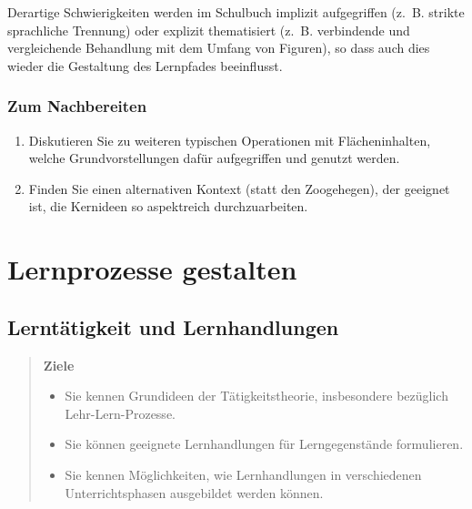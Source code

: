 \documentclass[
]{scrbook}
\providecommand{\tightlist}{%
  \setlength{\itemsep}{0pt}\setlength{\parskip}{0pt}}
\theoremstyle{definition}
\theoremstyle{definition}
\theoremstyle{definition}
\theoremstyle{definition}
\theoremstyle{remark}
\begin{document}
Derartige Schwierigkeiten werden im Schulbuch implizit aufgegriffen (z.~B. strikte sprachliche Trennung) oder explizit thematisiert (z.~B. verbindende und vergleichende Behandlung mit dem Umfang von Figuren), so dass auch dies wieder die Gestaltung des Lernpfades beeinflusst.

\hypertarget{erstesintermezzo-nachbereitung}{%
\section{Zum Nachbereiten}\label{erstesintermezzo-nachbereitung}}

\begin{enumerate}
\def\labelenumi{\arabic{enumi}.}
\tightlist
\item
  Diskutieren Sie zu weiteren typischen Operationen mit Flächeninhalten, welche Grundvorstellungen dafür aufgegriffen und genutzt werden.
\item
  Finden Sie einen alternativen Kontext (statt den Zoogehegen), der geeignet ist, die Kernideen so aspektreich durchzuarbeiten.
\end{enumerate}

\hypertarget{part-lernprozesse-gestalten}{%
\part*{Lernprozesse gestalten}\label{part-lernprozesse-gestalten}}

\hypertarget{lerntaetigkeit-und-lernhandlungen}{%
\chapter{Lerntätigkeit und Lernhandlungen}\label{lerntaetigkeit-und-lernhandlungen}}

\begin{quote}
\textbf{Ziele}

\begin{itemize}
\tightlist
\item
  Sie kennen Grundideen der Tätigkeitstheorie, insbesondere bezüglich Lehr-Lern-Prozesse.
\item
  Sie können geeignete Lernhandlungen für Lerngegenstände formulieren.
\item
  Sie kennen Möglichkeiten, wie Lernhandlungen in verschiedenen Unterrichtsphasen ausgebildet werden können.
\end{itemize}
\end{quote}
\end{document}
